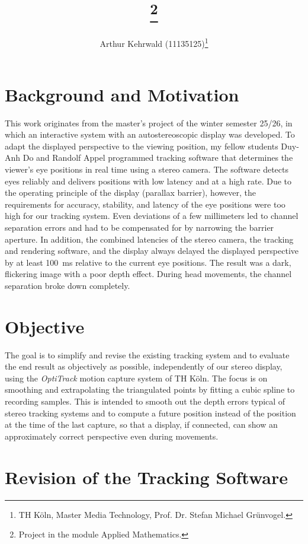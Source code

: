 \documentclass{siamart251216}
\title{\TheTitle\thanks{Project in the module Applied Mathematics.}}
\author{Arthur Kehrwald (11135125)\thanks{TH Köln, Master Media Technology, Prof. Dr. Stefan Michael Grünvogel.}}
\begin{document}
\maketitle

\section{Background and Motivation}
\label{sec:background}

This work originates from the master's project of the winter semester 25/26, in which an interactive system with an autostereoscopic display was developed.
To adapt the displayed perspective to the viewing position, my fellow students Duy-Anh Do and Randolf Appel programmed tracking software that determines the viewer's eye positions in real time using a stereo camera.
The software detects eyes reliably and delivers positions with low latency and at a high rate.
Due to the operating principle of the display (parallax barrier), however, the requirements for accuracy, stability, and latency of the eye positions were too high for our tracking system.
Even deviations of a few millimeters led to channel separation errors and had to be compensated for by narrowing the barrier aperture.
In addition, the combined latencies of the stereo camera, the tracking and rendering software, and the display always delayed the displayed perspective by at least 100~ms relative to the current eye positions.
The result was a dark, flickering image with a poor depth effect.
During head movements, the channel separation broke down completely.

\section{Objective}
\label{sec:objective}

The goal is to simplify and revise the existing tracking system and to evaluate the end result as objectively as possible, independently of our stereo display, using the \emph{OptiTrack} motion capture system of TH Köln.
The focus is on smoothing and extrapolating the triangulated points by fitting a cubic spline to recording samples.
This is intended to smooth out the depth errors typical of stereo tracking systems and to compute a future position instead of the position at the time of the last capture, so that a display, if connected, can show an approximately correct perspective even during movements.

\section{Revision of the Tracking Software}
\label{sec:revision}
\end{document}
